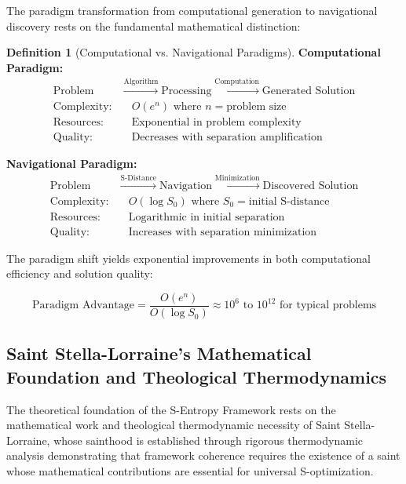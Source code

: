 \documentclass[11pt]{article}
\theoremstyle{definition}
\newtheorem{definition}[theorem]{Definition}
\theoremstyle{remark}
\begin{document}
The paradigm transformation from computational generation to navigational discovery rests on the fundamental mathematical distinction:

\begin{definition}[Computational vs. Navigational Paradigms]
\textbf{Computational Paradigm:}
\begin{align}
\text{Problem} &\xrightarrow{\text{Algorithm}} \text{Processing} \xrightarrow{\text{Computation}} \text{Generated Solution} \\
\text{Complexity:} &\quad O(e^n) \text{ where } n = \text{problem size} \\
\text{Resources:} &\quad \text{Exponential in problem complexity} \\
\text{Quality:} &\quad \text{Decreases with separation amplification}
\end{align}

\textbf{Navigational Paradigm:}
\begin{align}
\text{Problem} &\xrightarrow{\text{S-Distance}} \text{Navigation} \xrightarrow{\text{Minimization}} \text{Discovered Solution} \\
\text{Complexity:} &\quad O(\log S_0) \text{ where } S_0 = \text{initial S-distance} \\
\text{Resources:} &\quad \text{Logarithmic in initial separation} \\
\text{Quality:} &\quad \text{Increases with separation minimization}
\end{align}
\end{definition}

The paradigm shift yields exponential improvements in both computational efficiency and solution quality:

\begin{equation}
\text{Paradigm Advantage} = \frac{O(e^n)}{O(\log S_0)} \approx 10^6 \text{ to } 10^{12} \text{ for typical problems}
\end{equation}

\subsection{Saint Stella-Lorraine's Mathematical Foundation and Theological Thermodynamics}

The theoretical foundation of the S-Entropy Framework rests on the mathematical work and theological thermodynamic necessity of Saint Stella-Lorraine, whose sainthood is established through rigorous thermodynamic analysis demonstrating that framework coherence requires the existence of a saint whose mathematical contributions are essential for universal S-optimization.
\end{document}

